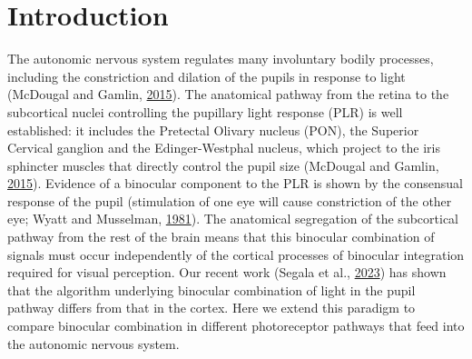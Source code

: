 \documentclass[
]{article}
\begin{document}
\hypertarget{introduction}{%
\section{Introduction}\label{introduction}}

The autonomic nervous system regulates many involuntary bodily processes, including the constriction and dilation of the pupils in response to light (McDougal and Gamlin, \protect\hyperlink{ref-McDougal2015}{2015}). The anatomical pathway from the retina to the subcortical nuclei controlling the pupillary light response (PLR) is well established: it includes the Pretectal Olivary nucleus (PON), the Superior Cervical ganglion and the Edinger-Westphal nucleus, which project to the iris sphincter muscles that directly control the pupil size (McDougal and Gamlin, \protect\hyperlink{ref-McDougal2015}{2015}). Evidence of a binocular component to the PLR is shown by the consensual response of the pupil (stimulation of one eye will cause constriction of the other eye; Wyatt and Musselman, \protect\hyperlink{ref-Wyatt1981}{1981}). The anatomical segregation of the subcortical pathway from the rest of the brain means that this binocular combination of signals must occur independently of the cortical processes of binocular integration required for visual perception. Our recent work (Segala et al., \protect\hyperlink{ref-Segala2023}{2023}) has shown that the algorithm underlying binocular combination of light in the pupil pathway differs from that in the cortex. Here we extend this paradigm to compare binocular combination in different photoreceptor pathways that feed into the autonomic nervous system.
\end{document}

